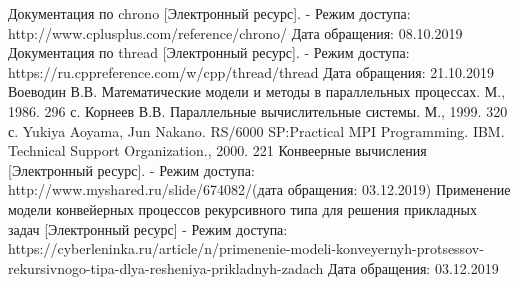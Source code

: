 \newpage
{}

\begin{thebibliography}{}
     Документация по chrono [Электронный ресурс]. -
    Режим доступа: http://www.cplusplus.com/reference/chrono/
    Дата обращения: 08.10.2019
     Документация по thread [Электронный ресурс]. -
    Режим доступа: https://ru.cppreference.com/w/cpp/thread/thread
    Дата обращения: 21.10.2019
     Воеводин В.В. Математические модели и методы в параллельных процессах. М., 1986. 296 с.
     Корнеев В.В. Параллельные вычислительные системы. М., 1999. 320 с.
     Yukiya Aoyama, Jun Nakano. RS/6000 SP:Practical MPI Programming. IBM. Technical Support Organization., 2000. 221
     Конвеерные вычисления [Электронный ресурс]. - Режим доступа: http://www.myshared.ru/slide/674082/(дата обращения: 03.12.2019)
     Применение модели конвейерных процессов рекурсивного типа для решения прикладных задач [Электронный ресурс] - Режим доступа: https://cyberleninka.ru/article/n/primenenie-modeli-konveyernyh-protsessov-rekursivnogo-tipa-dlya-resheniya-prikladnyh-zadach Дата обращения: 03.12.2019
\end{thebibliography}
